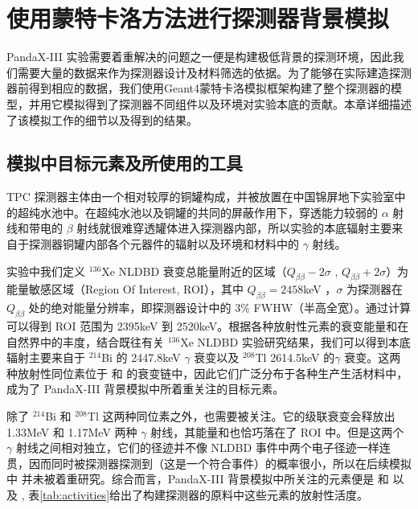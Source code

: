 \chapter{使用蒙特卡洛方法进行探测器背景模拟}
\label{chapter:background}

PandaX-III 实验需要着重解决的问题之一便是构建极低背景的探测环境，因此我们需要大量的数据来作为探测器设计及材料筛选的依据。为了能够在实际建造探测器前得到相应的数据，我们使用Geant4\supercite{Agostinelli:2002hh}蒙特卡洛模拟框架构建了整个探测器的模型，并用它模拟得到了探测器不同组件以及环境对实验本底的贡献。本章详细描述了该模拟工作的细节以及得到的结果。

\section{模拟中目标元素及所使用的工具}

 TPC 探测器主体由一个相对较厚的铜罐构成，并被放置在中国锦屏地下实验室中的超纯水池中。在超纯水池以及铜罐的共同的屏蔽作用下，穿透能力较弱的 $\alpha$ 射线和带电的 $\beta$ 射线就很难穿透罐体进入探测器内部，所以实验的本底辐射主要来自于探测器铜罐内部各个元器件的辐射以及环境和材料中的 $\gamma$ 射线。

实验中我们定义 $^{136}$Xe NLDBD 衰变总能量附近的区域（$Q_{\beta\beta}-2\sigma$ , $Q_{\beta\beta}+2\sigma$）为能量敏感区域（Region Of Interest, ROI），其中 $Q_{\beta\beta}=2458$keV ，$\sigma$ 为探测器在 $Q_{\beta\beta}$ 处的绝对能量分辨率，即探测器设计中的 3\% FWHW（半高全宽）。通过计算可以得到 ROI 范围为 2395keV 到 2520keV。根据各种放射性元素的衰变能量和在自然界中的丰度，结合既往有关 $^{136}$Xe NLDBD 实验研究结果，我们可以得到本底辐射主要来自于 $^{214}$Bi 的 2447.8keV $\gamma$ 衰变以及 $^{208}$Tl  2614.5keV 的$\gamma$ 衰变。这两种放射性同位素位于 \utte 和 \thttt 的衰变链中，因此它们广泛分布于各种生产生活材料中，成为了 PandaX-III 背景模拟中所着重关注的目标元素。

除了 $^{214}$Bi 和 $^{208}$Tl 这两种同位素之外，\cose 也需要被关注。它的级联衰变会释放出 1.33MeV 和 1.17MeV 两种 $\gamma$ 射线，其能量和也恰巧落在了 ROI 中。但是这两个 $\gamma$ 射线之间相对独立，它们的径迹并不像 NLDBD 事件中两个电子径迹一样连贯，因而同时被探测器探测到（这是一个符合事件）的概率很小，所以在后续模拟中 \cose 并未被着重研究。综合而言，PandaX-III 背景模拟中所关注的元素便是 \utte 和 \thttt 以及 \cose  , 表\ref{tab:activities}给出了构建探测器的原料中这些元素的放射性活度。

